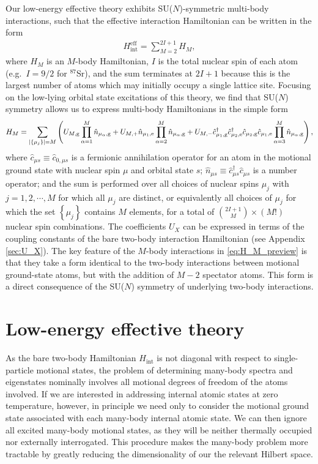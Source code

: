 \documentclass[preprint,showkeys,nofootinbib]{revtex4-1}
\renewcommand{\t}{\text} %
\newcommand{\p}[1]{\left(#1\right)} %
\renewcommand{\set}[1]{\left\{#1\right\}} %
\newcommand{\g}{\text{g}}
\newcommand{\e}{\text{e}}
\renewcommand{\c}{\hat{c}}
\newcommand{\n}{\hat{n}}
\newcommand{\1}{\mathds{1}}
\begin{document}
Our low-energy effective theory exhibits SU($N$)-symmetric multi-body
interactions, such that the effective interaction Hamiltonian can be
written in the form
\begin{align}
  H_{\t{int}}^{\t{eff}} = \sum_{M=2}^{2I+1} H_M,
\end{align}
where $H_M$ is an $M$-body Hamiltonian, $I$ is the total nuclear spin
of each atom (e.g.~$I=9/2$ for ${}^{87}$Sr), and the sum terminates at
$2I+1$ because this is the largest number of atoms which may initially
occupy a single lattice site.  Focusing on the low-lying orbital state
excitations of this theory, we find that SU($N$) symmetry allows us to
express multi-body Hamiltonians in the simple form
\begin{align}
  H_M = \sum_{\abs{\set{\mu_j}}=M}
  \p{U_{M,\g} \prod_{\alpha=1}^M \n_{\mu_\alpha,\g}
    + U_{M,+} \n_{\mu_1,\e} \prod_{\alpha=2}^M \n_{\mu_\alpha,\g}
    + U_{M,-} \c_{\mu_1,\g}^\dag \c_{\mu_2,\e}^\dag
    \c_{\mu_2,\g} \c_{\mu_1,\e} \prod_{\alpha=3}^M \n_{\mu_\alpha,\g}},
  \label{eq:H_M_preview}
\end{align}
where $\c_{\mu s}\equiv\c_{0,\mu s}$ is a fermionic annihilation
operator for an atom in the motional ground state with nuclear spin
$\mu$ and orbital state $s$;
$\n_{\mu s}\equiv \c_{\mu s}^\dag \c_{\mu s}$ is a number operator;
and the sum is performed over all choices of nuclear spins $\mu_j$
with $j=1,2,\cdots,M$ for which all $\mu_j$ are distinct, or
equivalently all choices of $\mu_j$ for which the set $\set{\mu_j}$
contains $M$ elements, for a total of ${2I+1\choose M}\times\p{M!}$
nuclear spin combinations.  The coefficients $U_X$ can be expressed in
terms of the coupling constants of the bare two-body interaction
Hamiltonian (see Appendix \ref{sec:U_X}).  The key feature of the
$M$-body interactions in \eqref{eq:H_M_preview} is that they take a
form identical to the two-body interactions between motional
ground-state atoms, but with the addition of $M-2$ spectator atoms.
This form is a direct consequence of the SU($N$) symmetry of
underlying two-body interactions.


\section{Low-energy effective theory}
\label{sec:low_energy}

As the bare two-body Hamiltonian $H_{\t{int}}$ is not diagonal with
respect to single-particle motional states, the problem of determining
many-body spectra and eigenstates nominally involves all motional
degrees of freedom of the atoms involved.  If we are interested in
addressing internal atomic states at zero temperature, however, in
principle we need only to consider the motional ground state
associated with each many-body internal atomic state.  We can then
ignore all excited many-body motional states, as they will be neither
thermally occupied nor externally interrogated.  This procedure makes
the many-body problem more tractable by greatly reducing the
dimensionality of our the relevant Hilbert space.
\end{document}
